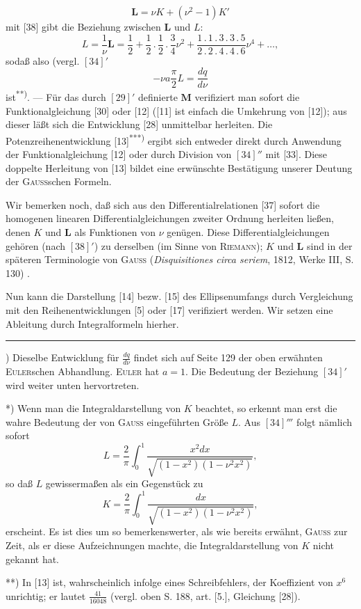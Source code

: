 \begin{equation*}\tag*{$[38]'$}\mathbf L=\nu K+(\nu^2-1)K'\end{equation*}
\noindent mit [38] gibt die Beziehung zwischen $\mathbf L$ und $L$:
\begin{equation*}\tag*{$[34]''$}L=\frac1\nu\mathbf L=\frac12+\frac12\,.\,\frac12\,.\,\frac34\nu^2+\frac{1\,.\,1\,.\,3\,.\,3\,.\,5}{2\,.\,2\,.\,4\,.\,4\,.\,6}\nu^4+\ldots,\end{equation*}
\noindent sodaß also (vergl. $[34]'$
\begin{equation*}\tag*{$[34]'''$}-\nu a\frac\pi2L=\frac{dq}{d\nu}\end{equation*}
\noindent ist\textsuperscript{**)}. — Für das durch $[29]'$ definierte $\mathbf M$ verifiziert man sofort die Funktionalgleichung [30] oder [12] ([11] ist einfach die Umkehrung von [12]); aus dieser läßt sich die Entwicklung [28] unmittelbar herleiten. Die Potenzreihenentwicklung [13]\textsuperscript{***)} ergibt sich entweder direkt durch Anwendung der Funktionalgleichung [12] oder durch Division von $[34]''$ mit [33]. Diese doppelte Herleitung von [13] bildet eine erwünschte Bestätigung unserer Deutung der \textsc{Gauss}schen Formeln.
\par\indent Wir bemerken noch, daß sich aus den Differentialrelationen [37] sofort die homogenen linearen Differentialgleichungen zweiter Ordnung herleiten ließen, denen $K$ und $\mathbf L$ als Funktionen von $\nu$ genügen. Diese Differentialgleichungen gehören (nach $[38]'$) zu derselben  (im Sinne von \textsc{Riemann}); $K$ und $\mathbf L$ sind in der späteren Terminologie von \textsc{Gauss} (\textit{Disquisitiones circa seriem}, 1812, Werke III, S. 130) .
\par\indent Nun kann die Darstellung [14] bezw. [15] des Ellipsenumfangs durch Vergleichung mit den Reihenentwicklungen [5] oder [17] verifiziert werden. Wir setzen eine Ableitung durch Integralformeln hierher.
\par\smallskip\noindent\rule{.25\linewidth}{.4pt}\par
{\small
\par\indent *) Dieselbe Entwicklung für $\frac{dq}{d\nu}$ findet sich auf Seite 129 der oben erwähnten \textsc{Euler}schen Abhandlung. \textsc{Euler} hat $a=1$. Die Bedeutung der Beziehung $[34]'$ wird weiter unten hervortreten.
\par\indent **) Wenn man die Integraldarstellung von $K$ beachtet, so erkennt man erst die wahre Bedeutung der von \textsc{Gauss} eingeführten Größe $L$. Aus $[34]'''$ folgt nämlich sofort
\[L=\frac2\pi\int_0^1\frac{x^2dx}{\sqrt{(1-x^2)(1-\nu^2x^2)}},\]
\noindent so daß $L$ gewissermaßen als ein Gegenstück zu
\[K=\frac2\pi\int_0^1\frac{dx}{\sqrt{(1-x^2)(1-\nu^2x^2)}},\]
\noindent erscheint. Es ist dies um so bemerkenswerter, als wie bereits erwähnt, \textsc{Gauss} zur Zeit, als er diese Aufzeichnungen machte, die Integraldarstellung von $K$ nicht gekannt hat.
\par\indent ***) In [13] ist, wahrscheinlich infolge eines Schreibfehlers, der Koeffizient von $x^6$ unrichtig; er lautet $\frac{41}{16048}$ (vergl. oben S. 188, art. [5.], Gleichung [28]).
\par}
